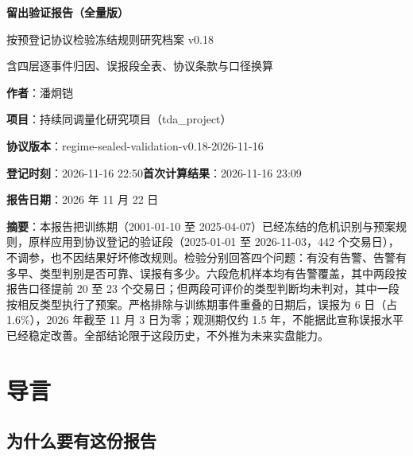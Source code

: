 \documentclass[12pt,a4paper]{ctexart}
\begin{document}
\begin{titlepage}
\vspace*{2.6cm}
\begin{center}
{\LARGE\bfseries 留出验证报告（全量版）\par}
\vspace{0.7cm}
{\large 按预登记协议检验冻结规则\quad 研究档案 v0.18\par}
\vspace{0.5cm}
{\normalsize 含四层逐事件归因、误报段全表、协议条款与口径换算\par}
\vspace{2.2cm}
{\normalsize \textbf{作者}：潘炯铠\par\vspace{0.35em}}
{\normalsize \textbf{项目}：持续同调量化研究项目（tda\_project）\par\vspace{0.35em}}
{\normalsize \textbf{协议版本}：regime-sealed-validation-v0.18-2026-11-16\par\vspace{0.35em}}
{\normalsize \textbf{登记时刻}：2026-11-16 22:50\quad\textbf{首次计算结果}：2026-11-16 23:09\par\vspace{0.35em}}
{\normalsize \textbf{报告日期}：2026 年 11 月 22 日\par}
\vspace{2.0cm}
\begin{minipage}{0.84\textwidth}
\small
\textbf{摘要}：本报告把训练期（2001-01-10 至 2025-04-07）已经冻结的危机识别与预案规则，原样应用到协议登记的验证段（2025-01-01 至 2026-11-03，442 个交易日），不调参，也不因结果好坏修改规则。检验分别回答四个问题：有没有告警、告警有多早、类型判别是否可靠、误报有多少。六段危机样本均有告警覆盖，其中两段按报告口径提前 20 至 23 个交易日；但两段可评价的类型判断均未判对，其中一段按相反类型执行了预案。严格排除与训练期事件重叠的日期后，误报为 6 日（占 1.6\%），2026 年截至 11 月 3 日为零；观测期仅约 1.5 年，不能据此宣称误报水平已经稳定改善。全部结论限于这段历史，不外推为未来实盘能力。
\end{minipage}
\end{center}
\end{titlepage}

\tableofcontents
\newpage

\section{导言}

\subsection{为什么要有这份报告}
\end{document}
